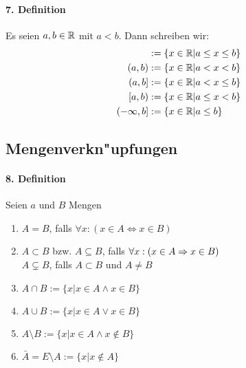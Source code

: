 \paragraph{7. Definition} Es seien $a,b\in\mathbb{R}$ mit $a<b$.\parskp
Dann schreiben wir:
\begin{align*}
	[a,b]&:=\{x\in\RR|a\le x\le b\}\\
	(a,b)&:=\{x\in\RR|a<x<b\}\\
	(a,b]&:=\{x\in\RR|a<x\le b\}\\
	[a,b)&:=\{x\in\RR|a\le x<b\}\\
	(-\infty,b]&:=\{x\in\RR|a\le b\}\\
\end{align*}

\subsection{Mengenverkn"upfungen}
\paragraph{8. Definition} Seien $a$ und $B$ Mengen
\begin{enumerate}[label=\alph*)]
	\item $A=B$, falls $\forall x:(x\in A\Leftrightarrow x\in B)$ 
	\item $A\subset B$ bzw. $A\subseteq B$, falls $\forall x:(x\in A\Rightarrow x\in B)$\\
	$A\subsetneq B$, falls $A\subset B$ und $A\neq B$ 
	\item $A\cap B:=\{x|x\in A\land x\in B\}$ 
	\item $A\cup B:=\{x|x\in A\lor x\in B\}$ 
	\item $A\setminus B:=\{x|x\in A\land x\notin B\}$ 
	\item $\bar A=E\setminus A:=\{x|x\notin A\}$ 
\end{enumerate}

